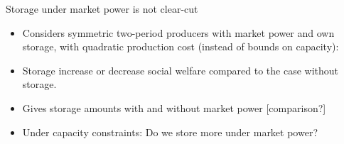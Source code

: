 \documentclass[aspectratio=169,t]{beamer}  %
\begin{document}
\begin{frame}{Storage under market power is not clear-cut}

\begin{quote} 
    \end{quote} 
\bigskip

\begin{itemize} 
\item  Considers symmetric two-period producers with market power and own storage, with quadratic production cost (instead of bounds on capacity):
   \item Storage  increase or decrease social welfare compared to the case without storage. 
    \item Gives storage amounts with and without market power [comparison?]
\end{itemize}
\bigskip

\begin{itemize}
\item Under capacity constraints: Do we store more under market power? 
\end{itemize}

\end{frame}
\end{document}

